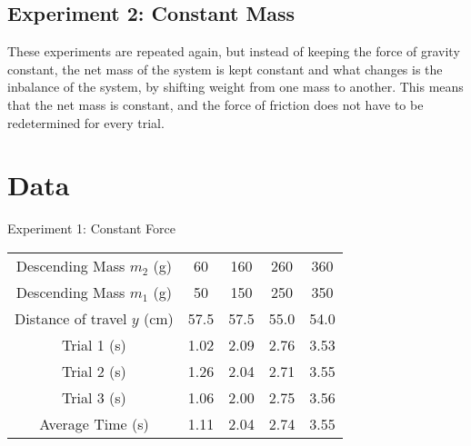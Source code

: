 \documentclass[12pt]{article}
\begin{document}
        \subsection{Experiment 2: Constant Mass}
            These experiments are repeated again, but instead of keeping the force
            of gravity constant, the net mass of the system is kept constant and
            what changes is the inbalance of the system, by shifting weight from 
            one mass to another. This means that the net mass is constant,
            and the force of friction does not have to be redetermined for
            every trial.
    \section{Data}
        {\large Experiment 1: Constant Force}
        \begin{center}
    
            \begin{tabular} {|c|c|c|c|c|}
            \hline
                Descending Mass $m_2$ (g) & 60 & 160 & 260 & 360 \\
                Descending Mass $m_1$ (g) & 50 & 150 & 250 & 350 \\
            \hline
            \hline
                Distance of travel $y$ (cm) & 57.5 & 57.5 & 55.0 & 54.0 \\
            \hline
            \hline
                Trial 1 (s) & 1.02 & 2.09 & 2.76 & 3.53 \\
                Trial 2 (s) & 1.26 & 2.04 & 2.71 & 3.55 \\
                Trial 3 (s) & 1.06 & 2.00 & 2.75 & 3.56 \\
                Average Time (s) & 1.11 & 2.04 & 2.74 & 3.55 \\
            \hline
                
            \end{tabular}
        \end{center}
\end{document}
